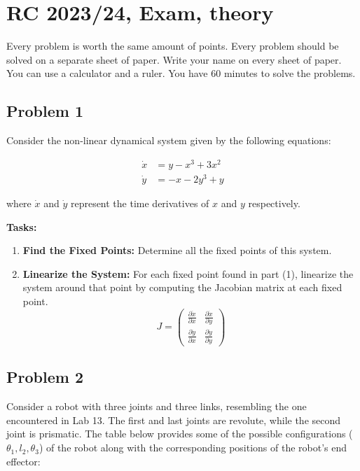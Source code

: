 \documentclass{article}
\begin{document}
\section*{RC 2023/24, Exam, theory}

Every problem is worth the same amount of points. Every problem
should be solved on a separate sheet of paper. Write your name on
every sheet of paper. You can use a calculator and a ruler. You
have 60 minutes to solve the problems.


\subsection*{Problem 1}

Consider the non-linear dynamical system given by the following
equations:

\begin{align}
    \dot{x} & = y - x^3 + 3x^2 \\
    \dot{y} & = -x - 2y^3 + y
\end{align}

where \(\dot{x}\) and \(\dot{y}\) represent the time derivatives of \(x\) and \(y\) respectively.

\textbf{Tasks:}

\begin{enumerate}
    \item \textbf{Find the Fixed Points:} Determine all the fixed points of this system.

    \item \textbf{Linearize the System:} For each fixed point found in part (1), linearize the system around that point by computing the Jacobian matrix at each fixed point.
          \[
              J = \begin{pmatrix}
                  \frac{\partial \dot{x}}{\partial x} & \frac{\partial \dot{x}}{\partial y} \\
                  \frac{\partial \dot{y}}{\partial x} & \frac{\partial \dot{y}}{\partial y}
              \end{pmatrix}
          \]
\end{enumerate}

\subsection*{Problem 2}

Consider a robot with three joints and three links,
resembling the one encountered in Lab 13.
The first and last joints are revolute, while the second
joint is prismatic. The table below provides some of the
possible configurations ($\theta_1, l_2, \theta_3$) of the
robot along with the corresponding positions of the robot's
end effector:
\end{document}
